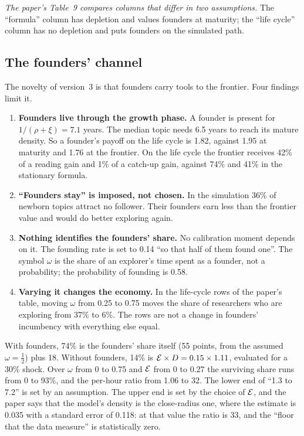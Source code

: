 \emph{The paper's Table~9 compares columns that differ in two assumptions.} The ``formula'' column has depletion and values founders at maturity; the ``life cycle'' column has no depletion and puts founders on the simulated path.

\subsection{The founders' channel}\label{sec:crit-founders}

The novelty of version~3 is that founders carry tools to the frontier. Four findings limit it.

\begin{enumerate}
\item \textbf{Founders live through the growth phase.} A founder is present for $1/(\rho+\xi)=7.1$ years. The median topic needs 6.5 years to reach its mature density. So a founder's payoff on the life cycle is 1.82, against 1.95 at maturity and 1.76 at the frontier. On the life cycle the frontier receives 42\% of a reading gain and 1\% of a catch-up gain, against 74\% and 41\% in the stationary formula.
\item \textbf{``Founders stay'' is imposed, not chosen.} In the simulation 36\% of newborn topics attract no follower. Their founders earn less than the frontier value and would do better exploring again.
\item \textbf{Nothing identifies the founders' share.} No calibration moment depends on it. The founding rate is set to 0.14 ``so that half of them found one''. The symbol $\omega$ is the share of an explorer's time spent as a founder, not a probability; the probability of founding is 0.58.
\item \textbf{Varying it changes the economy.} In the life-cycle rows of the paper's table, moving $\omega$ from 0.25 to 0.75 moves the share of researchers who are exploring from 37\% to 6\%. The rows are not a change in founders' incumbency with everything else equal.
\end{enumerate}

\begin{critbox}
With founders, 74\% is the founders' share itself (55 points, from the assumed $\omega=\tfrac12$) plus 18. Without founders, 14\% is $\mathcal{E}\times D=0.15\times1.11$, evaluated for a 30\% shock. Over $\omega$ from 0 to 0.75 and $\mathcal{E}$ from 0 to 0.27 the surviving share runs from 0 to 93\%, and the per-hour ratio from 1.06 to 32. The lower end of ``1.3 to 7.2'' is set by an assumption. The upper end is set by the choice of $\mathcal{E}$, and the paper says that the model's density is the close-radius one, where the estimate is 0.035 with a standard error of 0.118: at that value the ratio is 33, and the ``floor that the data measure'' is statistically zero.
\end{critbox}

